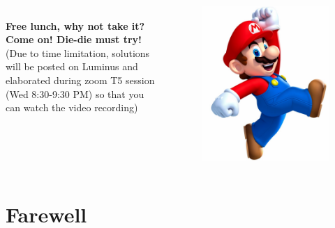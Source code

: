 \begin{frame}[fragile]{}
	\begin{columns}[t]
	\\\vspace{5pt}
	\textbf{Free lunch, why not take it?}\\
	\textbf{Come on! Die-die must try!}\\\vspace{10pt}
	(Due to time limitation, solutions will be posted on Luminus and elaborated during zoom T5 session (Wed 8:30-9:30 PM) so that you can watch the video recording)
	\begin{figure}
		\includegraphics[width=1\textwidth, trim=0 0 0 0, clip]{t5/images/mario.png}
	\end{figure}
\end{columns}
\end{frame}

% 

\section*{Farewell}

